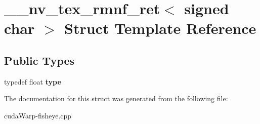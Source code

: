 \hypertarget{struct____nv__tex__rmnf__ret_3_01signed_01char_01_4}{}\section{\+\_\+\+\_\+nv\+\_\+tex\+\_\+rmnf\+\_\+ret$<$ signed char $>$ Struct Template Reference}
\label{struct____nv__tex__rmnf__ret_3_01signed_01char_01_4}
\subsection*{Public Types}
\begin{DoxyCompactItemize}
\item 
typedef float {\bfseries type}\hypertarget{struct____nv__tex__rmnf__ret_3_01signed_01char_01_4_ab21ce274c02bc599b226d518203baca2}{}\label{struct____nv__tex__rmnf__ret_3_01signed_01char_01_4_ab21ce274c02bc599b226d518203baca2}

\end{DoxyCompactItemize}


The documentation for this struct was generated from the following file\+:\begin{DoxyCompactItemize}
\item 
cuda\+Warp-\/fisheye.\+cpp\end{DoxyCompactItemize}
